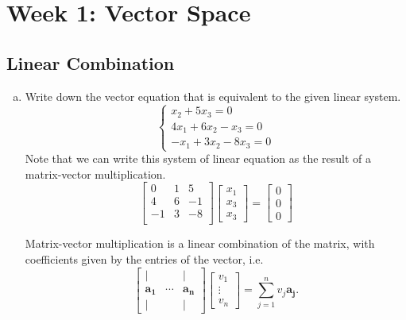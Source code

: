 \newpage
\section{Week 1: Vector Space}

\subsection{Linear Combination}
\begin{enumerate}[(a)]
    \item Write down the vector equation that is equivalent to the given linear system.
        $$
        \begin{cases}
            x_2 + 5x_3 = 0\\
            4x_1 + 6x_2 - x_3 = 0\\
            -x_1 + 3x_2 - 8x_3 = 0
        \end{cases}
        $$
        Note that we can write this system of linear equation as the result of a matrix-vector multiplication.
        $$
        \begin{bmatrix}
        0 & 1 & 5\\
        4 & 6 & -1\\
        -1 & 3 & -8\\
        \end{bmatrix}
        \begin{bmatrix}
        x_1 \\ x_3 \\ x_3
        \end{bmatrix} = \begin{bmatrix}0 \\ 0 \\ 0 \end{bmatrix}
        $$
        \begin{remark}
        Matrix-vector multiplication is a linear combination of the matrix, with coefficients given by the entries of the vector, i.e.
        $$
        \begin{bmatrix}
        \vert & & \vert \\
        \mathbf{a_1} & \cdots & \mathbf{a_n}\\
        \vert & & \vert
        \end{bmatrix}
        \begin{bmatrix}
        v_1 \\ \vdots \\ v_n
        \end{bmatrix} = \sum_{j=1}^n v_j\mathbf{a_j}.
$$
\end{remark}
\end{enumerate}
